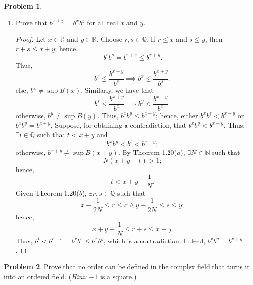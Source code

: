 \documentclass{amsart}
\theoremstyle{definition}
\newtheorem{problem}{Problem}
\begin{document}
\begin{problem}
\begin{enumerate}[label = (\alph*)]
\begin{proof}
            Choose $r,q \in \mathbb{Q}$. If $r \geq q$, then $\exists m,n \in \mathbb{Z}$ such that $n >0$ and
            \[
            \frac{m}{n} = r - q \geq 0.
            \]
            Given that $b > 1$, $b^m \geq 1$; however, 
            \[
            0 < (b^m)^{\frac{1}{n}} = b^{r-q} < 1 \implies 0 < b^m < 1,
            \]
            a contradiction, i.e. $b^{r-q} \geq 1$. Hence, $b^r = b^{r-q}b^q \geq b^q$, i.e. $b^r$ is an upper bound of $B(r)$. Note that $b^r \in B(r)$. Thus, $b^r = \sup B(r)$, i.e. defining
            \[
            b^x := \sup B(x)
            \]
            makes sense.
        \end{proof}
        \item Prove that $b^{x+y} = b^xb^y$ for all real $x$ and $y$.
        \begin{proof}
            Let $x \in \mathbb{R}$ and $y \in \mathbb{R}$. Choose $r,s \in \mathbb{Q}$. If $r \leq x$ and $s \leq y$, then $r+s \leq x+y$; hence,
            \[
            b^rb^s = b^{r+s} \leq b^{x+y}.
            \]
            Thus, 
            \[
            b^r \leq \frac{b^{x+y}}{b^s} \implies b^x \leq \frac{b^{x+y}}{b^s};
            \]
            else, $b^x \neq \sup B(x)$. Similarly, we have that
            \[
            b^s \leq \frac{b^{x+y}}{b^x} \implies b^y \leq \frac{b^{x+y}}{b^x};
            \]
            otherwise, $b^y \neq \sup B(y)$. Thus, $b^xb^y \leq b^{x+y}$; hence, either $b^xb^y < b^{x+y}$ or $b^xb^y = b^{x+y}$. Suppose, for obtaining a contradiction, that $b^xb^y < b^{x+y}$. Thus,  $\exists t \in \mathbb{Q}$ such that $t < x+y$ and
            \[
            b^xb^y < b^t < b^{x+y};
            \]
            otherwise, $b^{x+y} \neq \sup B(x+y)$. By Theorem 1.20($a$), $\exists N \in \mathbb{N}$ such that
            \[
            N(x+y-t) > 1;
            \]
            hence,
            \[
            t < x+y-\frac{1}{N}.
            \]
            Given Theorem 1.20($b$), $\exists r,s \in \mathbb{Q}$ such that
            \[
            x-\frac{1}{2N} \leq r \leq x \land y-\frac{1}{2N} \leq s \leq y;
            \]
            hence,
            \[
            x+y-\frac{1}{N} \leq r+s \leq x+y.
            \]
            Thus, $b^t < b^{r+s} = b^rb^s \leq b^xb^y$, which is a contradiction. Indeed, $b^xb^y = b^{x+y}$.
        \end{proof}    
    \end{enumerate}
\end{problem}

\begin{problem}
    Prove that no order can be defined in the complex field that turns it into an ordered field. (\textit{Hint:} $-1$ is a square.)
\end{problem}
\end{document}
